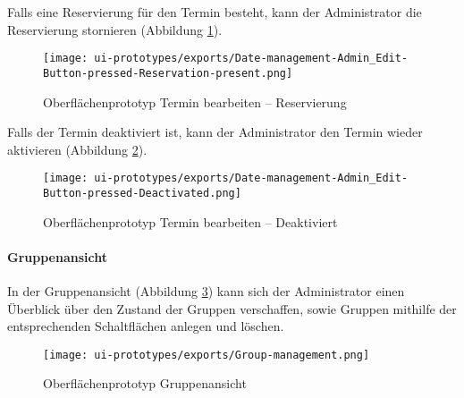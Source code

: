 Falls eine Reservierung für den Termin besteht, kann der Administrator die Reservierung stornieren (Abbildung \ref{fig:edit-button-pressed-reservation}).
\begin{figure}
  \centering
  \texttt{[image: ui-prototypes/exports/Date-management-Admin\_Edit-Button-pressed-Reservation-present.png]}
  \caption{Oberflächenprototyp Termin bearbeiten – Reservierung}
  \label{fig:edit-button-pressed-reservation}
\end{figure}

Falls der Termin deaktiviert ist, kann der Administrator den Termin wieder aktivieren (Abbildung \ref{fig:edit-button-pressed-deactivated}).
\begin{figure}
  \centering
  \texttt{[image: ui-prototypes/exports/Date-management-Admin\_Edit-Button-pressed-Deactivated.png]}
  \caption{Oberflächenprototyp Termin bearbeiten – Deaktiviert}
  \label{fig:edit-button-pressed-deactivated}
\end{figure}

\paragraph{Gruppenansicht}
In der Gruppenansicht (Abbildung \ref{fig:group-management}) kann sich der Administrator einen Überblick über den Zustand der Gruppen verschaffen, sowie Gruppen mithilfe der entsprechenden Schaltflächen anlegen und löschen.
\begin{figure}
  \centering
  \texttt{[image: ui-prototypes/exports/Group-management.png]}
  \caption{Oberflächenprototyp Gruppenansicht}
  \label{fig:group-management}
\end{figure}
